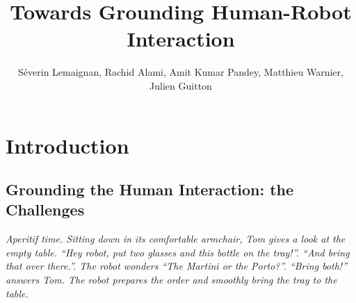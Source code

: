 \documentclass{svmult}
\begin{document}


\title*{Towards Grounding Human-Robot Interaction}

\author{
Séverin Lemaignan,
Rachid Alami,
Amit Kumar Pandey,
Matthieu Warnier,
Julien Guitton
}


\maketitle
\clearpage

\setcounter{minitocdepth}{2}
\dominitoc


\clearpage


\section{Introduction}

\subsection{Grounding the Human Interaction: the Challenges}

{\em Aperitif time. Sitting down in its comfortable armchair, Tom gives a look
at the empty table. ``{\em Hey robot, put two glasses and this bottle on the
tray!}''. ``{\em And bring that over there.}''. The robot wonders ``{\em The
Martini or the Porto?}''. ``{\em Bring both!}'' answers Tom. The robot prepares
the order and smoothly bring the tray to the table.}
\end{document}
